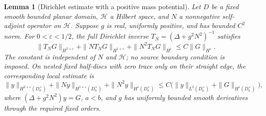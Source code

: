 \documentclass[11pt]{amsart}
\newtheorem{lemma}[theorem]{Lemma}
\theoremstyle{definition}
\theoremstyle{remark}
\theoremstyle{plain}
\begin{document}
\begin{lemma}[Dirichlet estimate with a positive mass potential]
\label{lem:forced-mass-dirichlet}
Let $D$ be a fixed smooth bounded planar domain, $\mathcal H$ a
Hilbert space, and $N$ a nonnegative self-adjoint operator on
$\mathcal H$. Suppose $g$ is real, uniformly positive, and has
bounded $C^2$ norm. For $0<\varepsilon<1/2$, the full Dirichlet
inverse $T_N=(\Delta+g^2N^2)^{-1}$ satisfies
\begin{equation}\label{eq:forced-mass-dirichlet}
 \|T_NG\|_{H^{2+\varepsilon}}
 +\|NT_NG\|_{H^{1+\varepsilon}}
 +\|N^2T_NG\|_{H^\varepsilon}
 \leq C\|G\|_{H^\varepsilon}.
\end{equation}
The constant is independent of $N$ and $\mathcal H$; no source
boundary condition is imposed. On nested fixed half-discs with
zero trace only on their straight edge, the corresponding local
estimate is
\begin{equation}\label{eq:forced-mass-local}
 \|y\|_{H^{2+\varepsilon}(D_a^+)}
 +\|Ny\|_{H^{1+\varepsilon}(D_a^+)}
 +\|N^2y\|_{H^\varepsilon(D_a^+)}
 \leq C\bigl(\|y\|_{L^2(D_b^+)}
                       +\|G\|_{H^\varepsilon(D_b^+)}\bigr),
\end{equation}
where $(\Delta+g^2N^2)y=G$, $a<b$, and $g$ has uniformly
bounded smooth derivatives through the required fixed orders.
\end{lemma}
\end{document}
